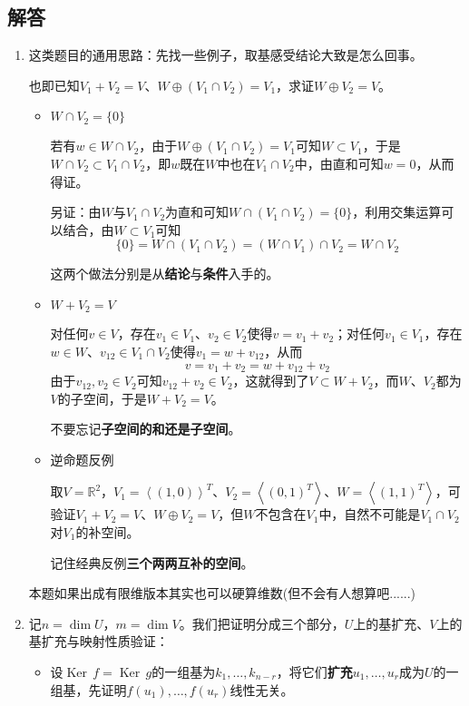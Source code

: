 \documentclass[a4paper,UTF8,fontset=windows,AutoFakeBold]{ctexart}
\DeclareMathOperator{\Ker}{Ker\,}
\newcommand*{\note}{\noindent *}
\begin{document}
\subsection{解答}
\begin{enumerate}
    \item \note 这类题目的通用思路：先找一些例子，取基感受结论大致是怎么回事。
    
    也即已知$V_1+V_2=V$、$W\oplus(V_1\cap V_2)=V_1$，求证$W\oplus V_2=V$。
    
    \begin{itemize}
        \item $W\cap V_2=\{0\}$
        
        若有$w\in W\cap V_2$，由于$W\oplus(V_1\cap V_2)=V_1$可知$W\subset V_1$，于是$W\cap V_2\subset V_1\cap V_2$，即$w$既在$W$中也在$V_1\cap V_2$中，由直和可知$w=0$，从而得证。

        另证：由$W$与$V_1\cap V_2$为直和可知$W\cap(V_1\cap V_2)=\{0\}$，利用交集运算可以结合，由$W\subset V_1$可知
        $$\{0\}=W\cap(V_1\cap V_2)=(W\cap V_1)\cap V_2=W\cap V_2$$

        \note 这两个做法分别是从\textbf{结论}与\textbf{条件}入手的。

        \item $W+V_2=V$
        
        对任何$v\in V$，存在$v_1\in V_1$、$v_2\in V_2$使得$v=v_1+v_2$；对任何$v_1\in V_1$，存在$w\in W$、$v_{12}\in V_1\cap V_2$使得$v_1=w+v_{12}$，从而
        $$v=v_1+v_2=w+v_{12}+v_2$$
        由于$v_{12},v_2\in V_2$可知$v_{12}+v_2\in V_2$，这就得到了$V\subset W+V_2$，而$W$、$V_2$都为$V$的子空间，于是$W+V_2=V$。

        \note 不要忘记\textbf{子空间的和还是子空间}。
        
        \item 逆命题反例
        
        取$V=\mathbb{R}^2$，$V_1=\left<(1,0)\right>^T$、$V_2=\left<(0,1)^T\right>$、$W=\left<(1,1)^T\right>$，可验证$V_1+V_2=V$、$W\oplus V_2=V$，但$W$不包含在$V_1$中，自然不可能是$V_1\cap V_2$对$V_1$的补空间。

        \note 记住经典反例\textbf{三个两两互补的空间}。
    \end{itemize}

    \note 本题如果出成有限维版本其实也可以硬算维数(但不会有人想算吧......)

    \item 记$n=\dim U$，$m=\dim V$。我们把证明分成三个部分，$U$上的基扩充、$V$上的基扩充与映射性质验证：
    \begin{itemize}
        \item 设$\Ker f=\Ker g$的一组基为$k_1,\dots,k_{n-r}$，将它们\textbf{扩充}$u_1,\dots,u_r$成为$U$的一组基，先证明$f(u_1),\dots,f(u_r)$线性无关。
        

\end{itemize}
\end{enumerate}
\end{document}
